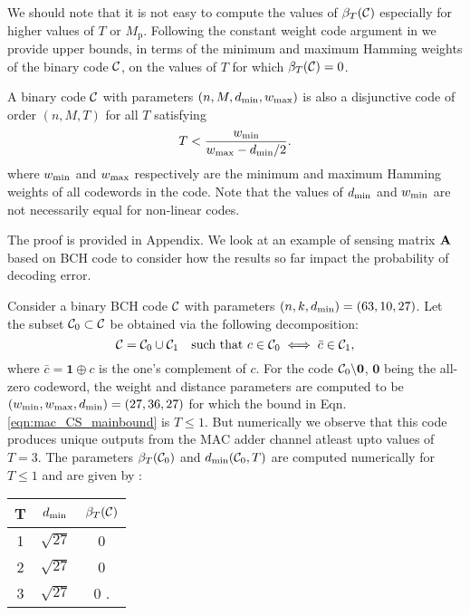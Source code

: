We should note that it is not easy to compute the values of $\beta_T(\mathcal{C})$ especially for higher values of $T$ or $M_\mathrm{p}$. Following the constant weight code argument in \cite{fan1995superimposed} we provide upper bounds, in terms of the minimum and maximum Hamming weights of the binary code $\mathcal{C}$, on the values of $T$ for which $\beta_T(\mathcal{C})=0$.
\begin{lemma}
A binary code $\mathcal{C}$ with parameters $(n,M,d_{\mathrm{min}},w_{\text{max}})$ is also a disjunctive code of order $(n,M,T)$ for all $T$ satisfying
\begin{align}
T<\frac{w_{\text{min}}}{w_{\text{max}}-d_{\mathrm{min}}/2}.
\label{eqn:mac_CS_mainbound}
\end{align}
where $w_{\text{min}}$ and $w_{\text{max}}$ respectively are the minimum and maximum Hamming weights of all codewords in the code. Note that the values of $d_{\mathrm{min}}$ and $w_{\text{min}}$ are not necessarily equal for non-linear codes.
\label{lem:mac_CS_mainbound}
\end{lemma}
The proof is provided in Appendix. We look at an example of sensing matrix $\mathbf{A}$ based on BCH code to consider how the results so far impact the probability of decoding error.
\begin{example}
Consider a binary BCH code $\mathcal{C}$ with parameters $(n,k,d_{\mathrm{min}})=(63,10,27)$. Let the subset $\mathcal{C}_0\subset \mathcal{C}$ be obtained via the following decomposition:
\[
\mathcal{C}=\mathcal{C}_0 \cup \mathcal{C}_1 ~~\text{ such that } c\in \mathcal{C}_0 \iff \bar{c}\in\mathcal{C}_1,
\]
where $\bar{c}=\mathbf{1}\oplus c$ is the one's complement of $c$. For the code $\mathcal{C}_0\backslash \mathbf{0}$, $\mathbf{0}$ being the all-zero codeword, the weight and distance parameters are computed to be $(w_{\text{min}},w_{\text{max}},d_{\mathrm{min}})=(27,36,27)$ for which the bound in Eqn. \eqref{eqn:mac_CS_mainbound} is $T\leq 1$. But numerically we observe that this code produces unique outputs from the MAC adder channel atleast upto values of $T=3$. The parameters $\beta_T(\mathcal{C}_0)$ and $d_{\mathrm{min}}(\mathcal{C}_0,T)$ are computed numerically for $T\leq 1$ and are given by :
\begin{center}
\begin{tabular}{ c c c }
T  &  $d_{\mathrm{min}}$& $\beta_T(\mathcal{C})$\\
\hline\hline
1	&	$\sqrt{27}$	& 0\\
2	& $\sqrt{27}$ & 0\\
3  &  $\sqrt{27}$& 0 .
\end{tabular}
\end{center}
\label{Ex:BCH_halfcode}
\end{example}

